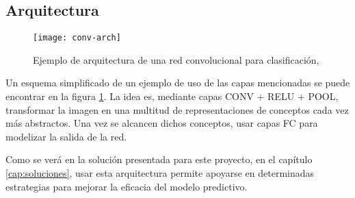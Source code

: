 \subsection{Arquitectura}
\label{sec:conv-net-arch}

\begin{figure}
    \centering
    \caption{Ejemplo de arquitectura de una red convolucional para clasificación, \parencite{clarifai}}
\label{conv-arch}
  \texttt{[image: conv-arch]}
\end{figure}

Un esquema simplificado de un ejemplo de uso de las capas mencionadas se puede encontrar en la figura \ref{conv-arch}. La idea es, mediante capas CONV + RELU + POOL, transformar la imagen en una multitud de representaciones de conceptos cada vez más abstractos. Una vez se alcancen dichos conceptos, usar capas FC para modelizar la salida de la red.

Como se verá en la solución presentada para este proyecto, en el capítulo \ref{cap:soluciones}, usar esta arquitectura permite apoyarse en determinadas estrategias para mejorar la eficacia del modelo predictivo.
